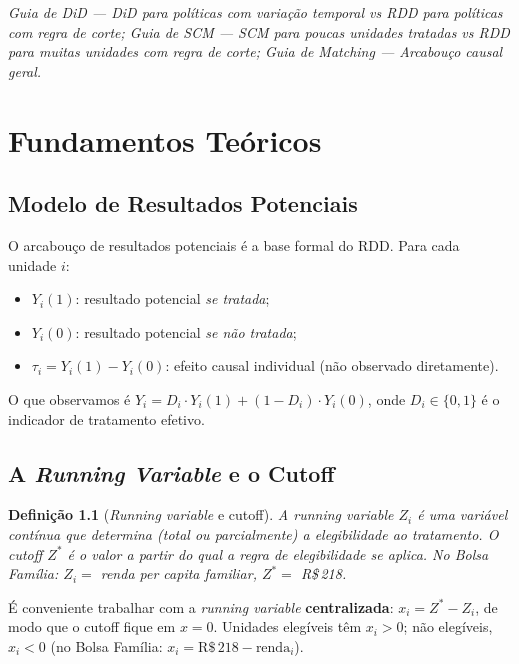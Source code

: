 \documentclass[12pt, a4paper, openany]{book}
\newtheorem{definicao}{Defini\c{c}\~ao}[chapter]
\begin{document}
\begin{conexaobox}
\textit{Guia de DiD --- DiD para pol\'iticas com varia\c{c}\~ao temporal vs RDD para pol\'iticas com regra de corte; Guia de SCM --- SCM para poucas unidades tratadas vs RDD para muitas unidades com regra de corte; Guia de Matching --- Arcabou\c{c}o causal geral.}
\end{conexaobox}


\chapter{Fundamentos Te\'oricos}

\section{Modelo de Resultados Potenciais}

O arcabou\c{c}o de resultados potenciais \citep{Rubin1974} \'e a base formal do RDD. Para cada unidade $i$:
\begin{itemize}[leftmargin=1.5cm, itemsep=2pt]
  \item $Y_i(1)$: resultado potencial \textit{se tratada};
  \item $Y_i(0)$: resultado potencial \textit{se n\~ao tratada};
  \item $\tau_i = Y_i(1) - Y_i(0)$: efeito causal individual (n\~ao observado diretamente).
\end{itemize}

O que observamos \'e $Y_i = D_i \cdot Y_i(1) + (1 - D_i) \cdot Y_i(0)$, onde $D_i \in \{0,1\}$ \'e o indicador de tratamento efetivo.

\section{A \textit{Running Variable} e o Cutoff}

\begin{definicao}[\textit{Running variable} e cutoff]
A \textit{running variable} $Z_i$ \'e uma vari\'avel cont\'inua que determina (total ou parcialmente) a elegibilidade ao tratamento. O cutoff $Z^*$ \'e o valor a partir do qual a regra de elegibilidade se aplica. No Bolsa Fam\'ilia: $Z_i = $ renda per capita familiar, $Z^* = $ R\$\,218.
\end{definicao}

\'E conveniente trabalhar com a \textit{running variable} \textbf{centralizada}: $x_i = Z^* - Z_i$, de modo que o cutoff fique em $x = 0$. Unidades eleg\'iveis t\^em $x_i > 0$; n\~ao eleg\'iveis, $x_i < 0$ (no Bolsa Fam\'ilia: $x_i = \text{R}\$\,218 - \text{renda}_i$).
\end{document}
